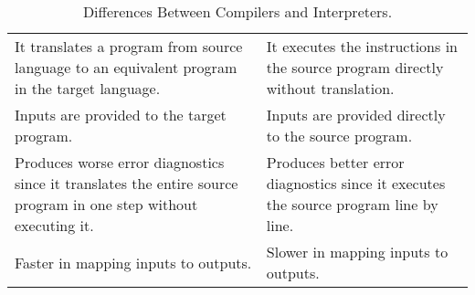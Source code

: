 \begin{table}[!ht]
    \centering
    \begin{tabularx}{\columnwidth}{|>{\raggedright\arraybackslash}X|>{\raggedright\arraybackslash}X|}
        \hline
        \multicolumn{1}{|c|}{\textbf{Compilers}} & \multicolumn{1}{c|}{\textbf{Interpreters}} \\
        \hline
        It translates a program from source language to an equivalent program 
        in the target language.
        &
        It executes the instructions in the source program directly without 
        translation. \\
        \hline
        Inputs are provided to the target program. 
        & 
        Inputs are provided directly to the source program. \\
        \hline
        Produces worse error diagnostics since it translates the entire source 
        program in one step without executing it.
        &
        Produces better error diagnostics since it executes the source program
        line by line. \\
        \hline
        Faster in mapping inputs to outputs.
        &
        Slower in mapping inputs to outputs. \\
        \hline        
    \end{tabularx}
    \caption{Differences Between Compilers and Interpreters.}
    \label{tab:010101}
\end{table} 